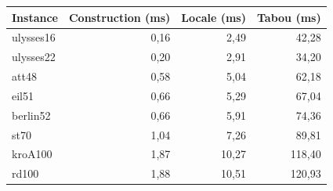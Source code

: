 \begin{tabular}{lrrr}
\toprule
Instance & Construction (ms) & Locale (ms) & Tabou (ms) \\
\midrule
ulysses16 & 0{,}16 & 2{,}49 & 42{,}28 \\
ulysses22 & 0{,}20 & 2{,}91 & 34{,}20 \\
att48 & 0{,}58 & 5{,}04 & 62{,}18 \\
eil51 & 0{,}66 & 5{,}29 & 67{,}04 \\
berlin52 & 0{,}66 & 5{,}91 & 74{,}36 \\
st70 & 1{,}04 & 7{,}26 & 89{,}81 \\
kroA100 & 1{,}87 & 10{,}27 & 118{,}40 \\
rd100 & 1{,}88 & 10{,}51 & 120{,}93 \\
\bottomrule
\end{tabular}
